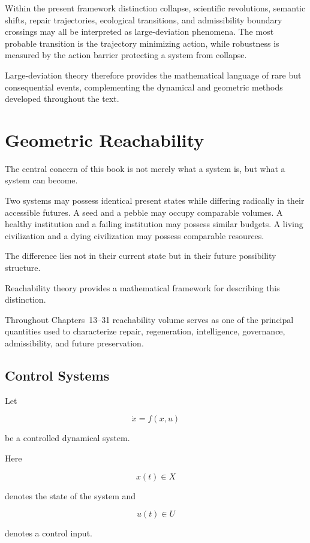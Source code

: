 \documentclass[12pt,twoside,openright]{book}
\begin{document}
Within the present framework distinction collapse,
scientific revolutions, semantic shifts, repair
trajectories, ecological transitions, and admissibility
boundary crossings may all be interpreted as
large-deviation phenomena. The most probable transition is
the trajectory minimizing action, while robustness is
measured by the action barrier protecting a system from
collapse.

Large-deviation theory therefore provides the
mathematical language of rare but consequential events,
complementing the dynamical and geometric methods
developed throughout the text.

\section{Geometric Reachability}

The central concern of this book is not merely what a
system is, but what a system can become.

Two systems may possess identical present states while
differing radically in their accessible futures. A seed
and a pebble may occupy comparable volumes. A healthy
institution and a failing institution may possess similar
budgets. A living civilization and a dying civilization
may possess comparable resources.

The difference lies not in their current state but in
their future possibility structure.

Reachability theory provides a mathematical framework for
describing this distinction.

Throughout Chapters~13--31 reachability volume serves as
one of the principal quantities used to characterize
repair, regeneration, intelligence, governance,
admissibility, and future preservation.

\subsection{Control Systems}

Let

\[
\dot x
=

f(x,u)
\]

be a controlled dynamical system.

Here

\[
x(t)\in X
\]

denotes the state of the system and

\[
u(t)\in U
\]

denotes a control input.
\end{document}

